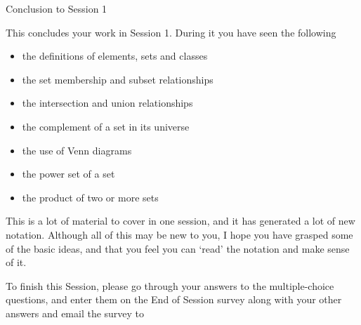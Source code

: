 \documentclass[a4paper]{cnx}
\begin{document}
\begin{cnxmodule}[id=m0001,name=Session 1: Set theory in the science of complex systems.]
\begin{ccontent}
\begin{csection}[id=conclusion-session-1]{Conclusion to Session 1}
\begin{cpara}
  This concludes your work in Session 1. During it you have seen the following
  \begin{itemize}
  \item the definitions of elements, sets and classes
  \item the set membership and subset relationships
  \item the intersection and union relationships
  \item the complement of a set in its universe
  \item the use of Venn diagrams
  \item the power set of a set
  \item the product of two or more sets
  \end{itemize}
  This is a lot of material to cover in one session, and it has generated a lot of new
  notation. Although all of this may be new to you, I hope you have grasped some of the
  basic ideas, and that you feel you can `read' the notation and make sense of it. 
\end{cpara}
\begin{cpara}
    To finish this Session, please go through your answers to the multiple-choice questions,
    and enter them on the End of Session survey along with your other answers and email the
    survey to 
  \begin{center}
  \end{center}
  \end{cpara}
\end{csection}
\end{ccontent}
\end{cnxmodule}
\end{document}
